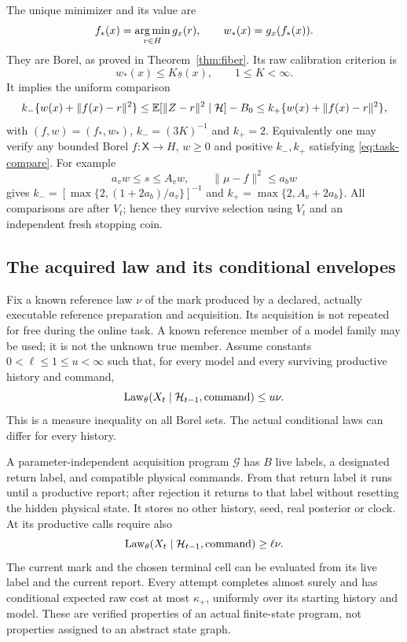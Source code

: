 The unique minimizer and its value are
\begin{equation}\label{eq:canonical-mark}
 f_*(x)=\operatorname*{arg\,min}_{r\in H}g_x(r),\qquad w_*(x)=g_x(f_*(x)).
\end{equation}
They are Borel, as proved in Theorem~\ref{thm:fiber}. Its raw calibration criterion is
\begin{equation}\label{eq:fiber-ratio}
 w_*(x)\le K\underline s(x),\qquad 1\le K<\infty.
\end{equation}
It implies the uniform comparison
\begin{equation}\label{eq:task-compare}
 k_-\{w(x)+\|f(x)-r\|^2\}
 \le \mathbb E[\|Z-r\|^2\mid\mathcal H]-B_0
 \le k_+\{w(x)+\|f(x)-r\|^2\},
\end{equation}
with $(f,w)=(f_*,w_*)$, $k_-=(3K)^{-1}$ and $k_+=2$. Equivalently one may verify any bounded Borel $f:\mathsf X\to H$, $w\ge0$ and positive $k_-,k_+$ satisfying \eqref{eq:task-compare}. For example
\begin{equation}\label{eq:ordinary-calibration}
 a_vw\le s\le A_vw,\qquad \|\mu-f\|^2\le a_bw
\end{equation}
gives $k_-=[\max\{2,(1+2a_b)/a_v\}]^{-1}$ and $k_+=\max\{2,A_v+2a_b\}$. All comparisons are after $V_t$; hence they survive selection using $V_t$ and an independent fresh stopping coin.

\subsection*{The acquired law and its conditional envelopes}
Fix a known reference law $\nu$ of the mark produced by a declared, actually executable reference preparation and acquisition. Its acquisition is not repeated for free during the online task. A known reference member of a model family may be used; it is not the unknown true member. Assume constants $0<\ell\le1\le u<\infty$ such that, for every model and every surviving productive history and command,
\begin{equation}\label{eq:mass-upper}
 \operatorname{Law}_\theta(X_t\mid\mathcal H_{t-1},\text{command})\le u\nu.
\end{equation}
This is a measure inequality on all Borel sets. The actual conditional laws can differ for every history.

A parameter-independent acquisition program $\mathcal G$ has $B$ live labels, a designated return label, and compatible physical commands. From that return label it runs until a productive report; after rejection it returns to that label without resetting the hidden physical state. It stores no other history, seed, real posterior or clock. At its productive calls require also
\begin{equation}\label{eq:mass-lower}
 \operatorname{Law}_\theta(X_t\mid\mathcal H_{t-1},\text{command})\ge\ell\nu.
\end{equation}
The current mark and the chosen terminal cell can be evaluated from its live label and the current report. Every attempt completes almost surely and has conditional expected raw cost at most $\kappa_+$, uniformly over its starting history and model. These are verified properties of an actual finite-state program, not properties assigned to an abstract state graph.

